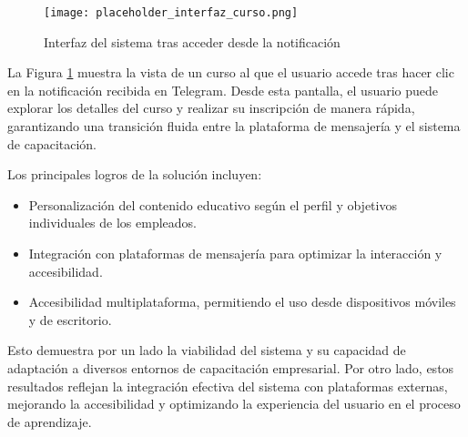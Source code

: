 \begin{figure}[htbp]
    \centering
    \texttt{[image: placeholder\_interfaz\_curso.png]}
    \caption{Interfaz del sistema tras acceder desde la notificación}
    \label{fig:interfaz_curso_ejemplo}
\end{figure}

La Figura \ref{fig:interfaz_curso_ejemplo} muestra la vista de un curso al que
el usuario accede tras hacer clic en la notificación recibida en Telegram. Desde
esta pantalla, el usuario puede explorar los detalles del curso y realizar su
inscripción de manera rápida, garantizando una transición fluida entre la
plataforma de mensajería y el sistema de capacitación.

Los principales logros de la solución incluyen:
\begin{itemize}
    \item Personalización del contenido educativo según el perfil y objetivos
    individuales de los empleados.
    \item Integración con plataformas de mensajería para optimizar la
    interacción y accesibilidad.
    \item Accesibilidad multiplataforma, permitiendo el uso desde dispositivos
    móviles y de escritorio.
\end{itemize}

Esto demuestra por un lado la viabilidad del sistema y su capacidad de
adaptación a diversos entornos de capacitación empresarial. Por otro lado, estos
resultados reflejan la integración efectiva del sistema con plataformas
externas, mejorando la accesibilidad y optimizando la experiencia del usuario en
el proceso de aprendizaje.
